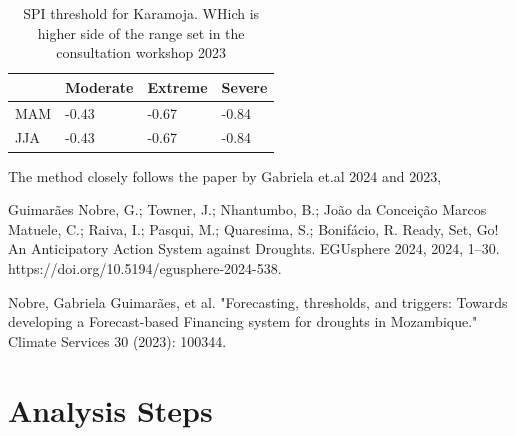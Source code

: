 \begin{table}[!ht]
	\centering
	\caption[SPI threshold for Karamoja ]{SPI threshold for Karamoja. WHich is higher side of the range set in the consultation workshop 2023}
	\label{tab:incpacks}
	\begin{tabular}{p{}p{}p{}p{}}
		\toprule
		&\textbf{Moderate} &\textbf{Extreme} &\textbf{Severe}\\
		\midrule
	MAM &-0.43 &-0.67 &-0.84 \\
	JJA &-0.43 &-0.67 &-0.84 \\
		\bottomrule
	\end{tabular}
\end{table}




The method closely follows the paper by Gabriela et.al 2024 and 2023,

Guimarães Nobre, G.; Towner, J.; Nhantumbo, B.; João da Conceição Marcos Matuele, C.; Raiva, I.; Pasqui, M.; Quaresima, S.; Bonifácio, R. Ready, Set, Go! An Anticipatory Action System against Droughts. EGUsphere 2024, 2024, 1–30. https://doi.org/10.5194/egusphere-2024-538.


Nobre, Gabriela Guimarães, et al. "Forecasting, thresholds, and triggers: Towards developing a Forecast-based Financing system for droughts in Mozambique." Climate Services 30 (2023): 100344. 


\section{Analysis Steps}

